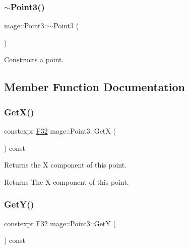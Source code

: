 \subsubsection{\texorpdfstring{$\sim$\+Point3()}{~Point3()}}
{\footnotesize\ttfamily mage\+::\+Point3\+::$\sim$\+Point3 (\begin{DoxyParamCaption}{ }\end{DoxyParamCaption})\hspace{0.3cm}{\ttfamily [default]}}

Constructs a point. 

\subsection{Member Function Documentation}
\mbox{\label{structmage_1_1_point3_a94373be88e1cf76819b1c458860299dd}} 
\subsubsection{\texorpdfstring{Get\+X()}{GetX()}}
{\footnotesize\ttfamily constexpr \mbox{\hyperlink{namespacemage_aa97e833b45f06d60a0a9c4fc22ae02c0}{F32}} mage\+::\+Point3\+::\+GetX (\begin{DoxyParamCaption}{ }\end{DoxyParamCaption}) const\hspace{0.3cm}{\ttfamily [noexcept]}}

Returns the X component of this point.

\begin{DoxyReturn}{Returns}
The X component of this point. 
\end{DoxyReturn}
\mbox{\label{structmage_1_1_point3_a63a6f60b65b3c3b8fadc03f229f410a1}} 
\subsubsection{\texorpdfstring{Get\+Y()}{GetY()}}
{\footnotesize\ttfamily constexpr \mbox{\hyperlink{namespacemage_aa97e833b45f06d60a0a9c4fc22ae02c0}{F32}} mage\+::\+Point3\+::\+GetY (\begin{DoxyParamCaption}{ }\end{DoxyParamCaption}) const\hspace{0.3cm}{\ttfamily [noexcept]}}

